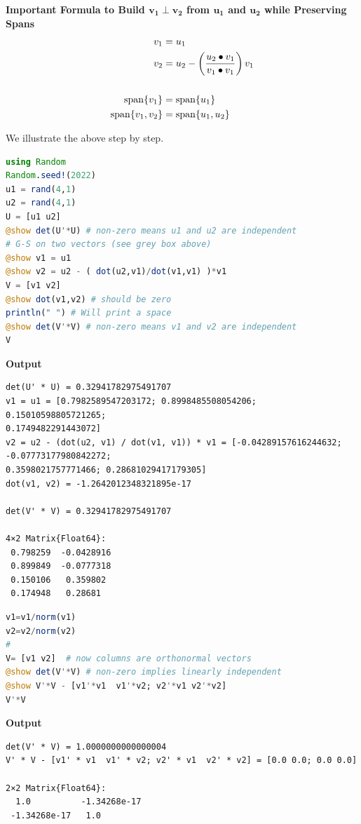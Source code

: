 \begin{tcolorbox}
\textbf{Important Formula to Build $\boldsymbol{v_1 \perp v_2}$ from $\boldsymbol{u_1}$ and $\boldsymbol{u_2}$ while Preserving Spans}
\begin{equation}
    \label{eq:OrthognalProjection01}
    \begin{aligned}
    v_1 &= u_1\\
    v_2 &= u_2 -  \left(\frac{u_2 \bullet v_1}{v_1 \bullet v_1}\right) v_1\\
    \\ 
    \mathrm{span} \{ v_1 \}&=\mathrm{span} \{ u_1 \}\\
    \mathrm{span} \{ v_1, v_2 \}&= \mathrm{span} \{ u_1, u_2 \}
     \end{aligned}
\end{equation}
\end{tcolorbox}

We illustrate the above step by step.

\begin{lstlisting}[language=Julia,style=mystyle]
using Random
Random.seed!(2022)
u1 = rand(4,1)
u2 = rand(4,1)
U = [u1 u2]
@show det(U'*U) # non-zero means u1 and u2 are independent
# G-S on two vectors (see grey box above)
@show v1 = u1
@show v2 = u2 - ( dot(u2,v1)/dot(v1,v1) )*v1
V = [v1 v2]
@show dot(v1,v2) # should be zero
println(" ") # Will print a space
@show det(V'*V) # non-zero means v1 and v2 are independent
V
\end{lstlisting}
\textbf{Output} 
\begin{verbatim}
det(U' * U) = 0.32941782975491707
v1 = u1 = [0.7982589547203172; 0.8998485508054206; 0.15010598805721265;
0.1749482291443072]
v2 = u2 - (dot(u2, v1) / dot(v1, v1)) * v1 = [-0.04289157616244632; -0.07773177980842272;
0.3598021757771466; 0.28681029417179305]
dot(v1, v2) = -1.2642012348321895e-17
 
det(V' * V) = 0.32941782975491707

4×2 Matrix{Float64}:
 0.798259  -0.0428916
 0.899849  -0.0777318
 0.150106   0.359802
 0.174948   0.28681
\end{verbatim}

\begin{lstlisting}[language=Julia,style=mystyle]
v1=v1/norm(v1)  
v2=v2/norm(v2)
# 
V= [v1 v2]  # now columns are orthonormal vectors
@show det(V'*V) # non-zero implies linearly independent
@show V'*V - [v1'*v1  v1'*v2; v2'*v1 v2'*v2]
V'*V
\end{lstlisting}
\textbf{Output} 
\begin{verbatim}
det(V' * V) = 1.0000000000000004
V' * V - [v1' * v1  v1' * v2; v2' * v1  v2' * v2] = [0.0 0.0; 0.0 0.0]

2×2 Matrix{Float64}:
  1.0          -1.34268e-17
 -1.34268e-17   1.0
\end{verbatim}



